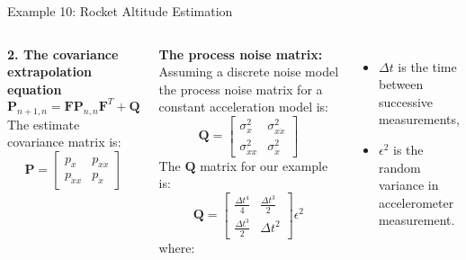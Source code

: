 \begin{frame}{Example 10: Rocket Altitude Estimation}
\begin{columns}

\textbf{2. The covariance extrapolation equation}
\begin{equation*}
\mathbf{P}_{n+1,n} = \mathbf{F}\mathbf{P}_{n,n}\mathbf{F}^T + \mathbf{Q}
\end{equation*}
The estimate covariance matrix is:
\[
\mathbf{P} =
\begin{bmatrix}
p_{x} & p_{x\dot{x}} \\
p_{\dot{x}x} & p_{\dot{x}}
\end{bmatrix}
\]

\textbf{The process noise matrix:}
Assuming a discrete noise model the process noise matrix for a constant acceleration model is:
\vspace{-5pt}
\[
\mathbf{Q} =
\begin{bmatrix}
\sigma^2_x & \sigma^2_{x\dot{x}} \\
\sigma^2_{\dot{x}x} & \sigma^2_{\dot{x}}
\end{bmatrix}
\]
\vspace{-5pt}
The \(\mathbf{Q}\) matrix for our example is:
\[
\mathbf{Q} =
\begin{bmatrix}
\frac{\Delta t^4}{4} & \frac{\Delta t^3}{2} \\
\frac{\Delta t^3}{2} & \Delta t^2
\end{bmatrix}
\epsilon^2
\]
\vspace{-5pt}
where:
\begin{itemize}
    \item \(\Delta t\) is the time between successive measurements,
    \item \(\epsilon^2\) is the random variance in accelerometer measurement.
\end{itemize}

\end{columns}
\end{frame}        

